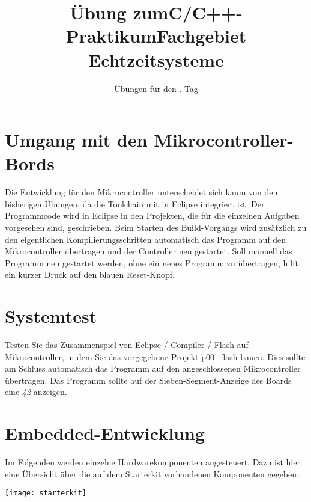 \documentclass[
  accentcolor=tud1c,	%
  colorbacktitle,		%
  inverttitle,			%
  german,				%
  twoside
]{tudexercise}
\title{Übung zum\linebreak[1]C/C++-Praktikum\linebreak[1] Fachgebiet Echtzeitsysteme}
\subtitle{Übungen für den \tag{}. Tag}
\newcommand{\tag}{5}
\begin{document}
\begin{examheader}
	\textmb{Übung zum C/C++-Praktikum - Tag \tag{}}
\end{examheader}
\maketitle 


\section{Umgang mit den Mikrocontroller-Bords}

Die Entwicklung für den Mikrocontroller unterscheidet sich kaum von den bisherigen Übungen, da die Toolchain mit in Eclipse integriert ist. Der Programmcode wird in Eclipse in den Projekten, die für die einzelnen Aufgaben vorgesehen sind, geschrieben. Beim Starten des Build-Vorgangs wird zusätzlich zu den eigentlichen Kompilierungsschritten automatisch das Programm auf den Mikrocontroller übertragen und der Controller neu gestartet. Soll manuell das Programm neu gestartet werden, ohne ein neues Programm zu übertragen, hilft ein kurzer Druck auf den blauen Reset-Knopf.


\section{Systemtest}

Testen Sie das Zusammenspiel von Eclipse / Compiler / Flash auf Mikrocontroller, in dem Sie das vorgegebene Projekt p00\_flash bauen. Dies sollte am Schluss automatisch das Programm auf den angeschlossenen Mikrocontroller übertragen. Das Programm sollte auf der Sieben-Segment-Anzeige des Boards eine \textit{42} anzeigen.



\section{Embedded-Entwicklung}

Im Folgenden werden einzelne Hardwarekomponenten angesteuert. Dazu ist hier eine Übersicht über die auf dem Starterkit vorhandenen Komponenten gegeben.
\begin{center}\texttt{[image: starterkit]}\end{center}
\end{document}
